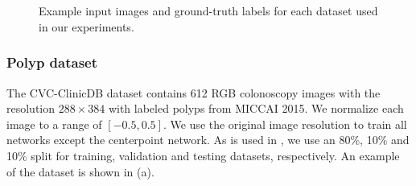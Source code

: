 	\begin{figure}
	\hfill
	 \\
	\hfill
	 \\
	\caption{Example input images and ground-truth labels for each dataset used in our experiments.}
	\label{fig:datasets}
	\end{figure}

      \subsubsection{Polyp dataset}

The CVC-ClinicDB dataset
\cite{bernalWMDOVAMapsAccurate2015} contains 612 RGB 
colonoscopy images with the resolution $288 \times 384$ 
with labeled polyps from MICCAI 2015. We normalize each image to a range of $[-0.5, 0.5]$. 
We use the original image resolution to train all networks except the 
centerpoint network. As is used in \cite{jhaDoubleUNetDeepConvolutional2020}, 
we use an 80\%, 10\% and 10\% 
split for training, validation and testing datasets, respectively. An example of the dataset is shown in (a).

